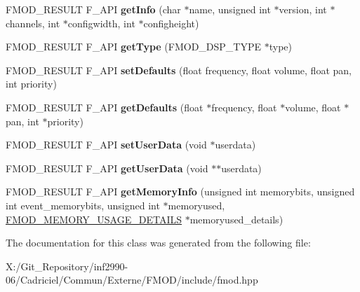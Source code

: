 \begin{DoxyCompactItemize}
\item 
\hypertarget{class_f_m_o_d_1_1_d_s_p_a5bb61015d7b0e835437e46ea4eaf6442}{F\-M\-O\-D\-\_\-\-R\-E\-S\-U\-L\-T F\-\_\-\-A\-P\-I {\bfseries get\-Info} (char $\ast$name, unsigned int $\ast$version, int $\ast$channels, int $\ast$configwidth, int $\ast$configheight)}\label{class_f_m_o_d_1_1_d_s_p_a5bb61015d7b0e835437e46ea4eaf6442}

\item 
\hypertarget{class_f_m_o_d_1_1_d_s_p_a7241c2669554667f90d4f2a576f64c4a}{F\-M\-O\-D\-\_\-\-R\-E\-S\-U\-L\-T F\-\_\-\-A\-P\-I {\bfseries get\-Type} (F\-M\-O\-D\-\_\-\-D\-S\-P\-\_\-\-T\-Y\-P\-E $\ast$type)}\label{class_f_m_o_d_1_1_d_s_p_a7241c2669554667f90d4f2a576f64c4a}

\item 
\hypertarget{class_f_m_o_d_1_1_d_s_p_a97919dbf4f783369b75f1bc43527489d}{F\-M\-O\-D\-\_\-\-R\-E\-S\-U\-L\-T F\-\_\-\-A\-P\-I {\bfseries set\-Defaults} (float frequency, float volume, float pan, int priority)}\label{class_f_m_o_d_1_1_d_s_p_a97919dbf4f783369b75f1bc43527489d}

\item 
\hypertarget{class_f_m_o_d_1_1_d_s_p_a80aa58e2f153dd3ad5fb6bf9305fc00e}{F\-M\-O\-D\-\_\-\-R\-E\-S\-U\-L\-T F\-\_\-\-A\-P\-I {\bfseries get\-Defaults} (float $\ast$frequency, float $\ast$volume, float $\ast$pan, int $\ast$priority)}\label{class_f_m_o_d_1_1_d_s_p_a80aa58e2f153dd3ad5fb6bf9305fc00e}

\item 
\hypertarget{class_f_m_o_d_1_1_d_s_p_a5aacd4725dbe50b725146bd6c412b0f4}{F\-M\-O\-D\-\_\-\-R\-E\-S\-U\-L\-T F\-\_\-\-A\-P\-I {\bfseries set\-User\-Data} (void $\ast$userdata)}\label{class_f_m_o_d_1_1_d_s_p_a5aacd4725dbe50b725146bd6c412b0f4}

\item 
\hypertarget{class_f_m_o_d_1_1_d_s_p_a1b9014166d1ad45923da3227d8db3439}{F\-M\-O\-D\-\_\-\-R\-E\-S\-U\-L\-T F\-\_\-\-A\-P\-I {\bfseries get\-User\-Data} (void $\ast$$\ast$userdata)}\label{class_f_m_o_d_1_1_d_s_p_a1b9014166d1ad45923da3227d8db3439}

\item 
\hypertarget{class_f_m_o_d_1_1_d_s_p_acac5f7f04e8e67719a712f848793e8f8}{F\-M\-O\-D\-\_\-\-R\-E\-S\-U\-L\-T F\-\_\-\-A\-P\-I {\bfseries get\-Memory\-Info} (unsigned int memorybits, unsigned int event\-\_\-memorybits, unsigned int $\ast$memoryused, \hyperlink{struct_f_m_o_d___m_e_m_o_r_y___u_s_a_g_e___d_e_t_a_i_l_s}{F\-M\-O\-D\-\_\-\-M\-E\-M\-O\-R\-Y\-\_\-\-U\-S\-A\-G\-E\-\_\-\-D\-E\-T\-A\-I\-L\-S} $\ast$memoryused\-\_\-details)}\label{class_f_m_o_d_1_1_d_s_p_acac5f7f04e8e67719a712f848793e8f8}

\end{DoxyCompactItemize}


The documentation for this class was generated from the following file\-:\begin{DoxyCompactItemize}
\item 
X\-:/\-Git\-\_\-\-Repository/inf2990-\/06/\-Cadriciel/\-Commun/\-Externe/\-F\-M\-O\-D/include/fmod.\-hpp\end{DoxyCompactItemize}
